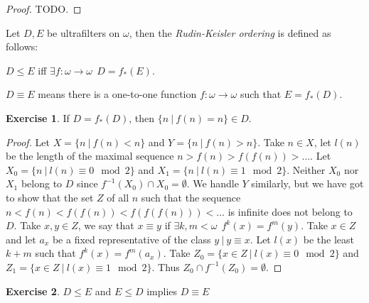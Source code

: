 \documentclass[8pt]{article}
\theoremstyle{definition}
\theoremstyle{definition}
\theoremstyle{definition}
\theoremstyle{definition}
\theoremstyle{definition}
\theoremstyle{definition}
\theoremstyle{definition}
\theoremstyle{definition}
\theoremstyle{definition}
\theoremstyle{definition}
\theoremstyle{definition}
\theoremstyle{definition}
\theoremstyle{definition}
\newtheorem{exercise}{Exercise}[section]
\theoremstyle{definition}
\theoremstyle{question}
\begin{document}
\begin{proof}
  TODO.
\end{proof}

Let $D, E$ be ultrafilters on $\omega$, then the \emph{Rudin-Keisler ordering} is defined as follows:
\begin{center}
  $D \leq E$ iff $\exists f : \omega \to \omega \:\: D = f_*(E)$.
\end{center}
$D \equiv E$ means there is a one-to-one function $f : \omega \to \omega$ such that $E = f_*(D)$.

\begin{exercise}
  If $D = f_*(D)$, then $\{ n \: | \: f(n) = n \} \in D$.
\end{exercise}

\begin{proof}
  Let $X = \{ n \: | \: f(n) < n \}$ and $Y = \{ n \: | \: f(n) > n\}$. Take $n \in X$, let
  $l(n)$ be the length of the maximal sequence $n > f(n) > f(f(n)) > \dots$.
  Let $X_0 = \{ n \: | \: l(n) \equiv 0 \mod 2\}$ and $X_1 = \{ n \: | \: l(n) \equiv 1 \mod 2\}$.
  Neither $X_0$ nor $X_1$ belong to $D$ since $f^{-1}(X_0) \cap X_0 = \emptyset$. 
  We handle $Y$ similarly, but we have got to show that the set $Z$ of all $n$ such that
  the sequence $n < f(n) < f(f(n)) < f(f(f(n))) < \dots$ is infinite does not belong to $D$.
  Take $x, y \in Z$, we say that $x \equiv y$ if $\exists k, m < \omega \:\: f^{k}(x) = f^m(y)$.
  Take $x \in Z$ and let $a_x$ be a fixed representative of the class ${y \: | \: y \equiv x }$.
  Let $l(x)$ be the least $k + m$ such that $f^k(x) = f^m(a_x)$.
  Take $Z_0 = \{ x \in Z \: | \: l(x) \equiv 0 \mod 2 \}$ and $Z_1 = \{ x \in Z \: | \: l(x) \equiv 1 \mod 2 \}$.
  Thus $Z_0 \cap f^{-1}(Z_0) = \emptyset$.
\end{proof}

\begin{exercise}
  $D \leq E$ and $E \leq D$ implies $D \equiv E$
\end{exercise}
\end{document}
